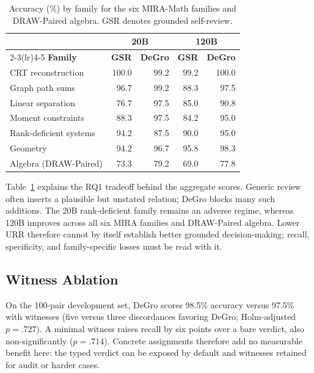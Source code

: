 \documentclass[sigconf,anonymous]{aamas}
\begin{document}
\begin{table}[t]
\centering
\caption{Accuracy (\%) by family for the six MIRA-Math families and DRAW-Paired algebra. GSR denotes grounded self-review.}
\label{tab:family}
\setlength{\tabcolsep}{3.5pt}
\renewcommand{\arraystretch}{1.05}
\begin{tabular}{@{}lrrrr@{}}
\toprule
& \multicolumn{2}{c}{\textbf{20B}} & \multicolumn{2}{c}{\textbf{120B}}\\
\cmidrule(lr){2-3}\cmidrule(lr){4-5}
\textbf{Family} & \textbf{GSR} & \textbf{DeGro} & \textbf{GSR} & \textbf{DeGro}\\
\midrule
CRT reconstruction       & 100.0 & 99.2 & 99.2 & 100.0\\
Graph path sums          & 96.7  & 99.2 & 88.3 & 97.5\\
Linear separation        & 76.7  & 97.5 & 85.0 & 90.8\\
Moment constraints       & 88.3  & 97.5 & 84.2 & 95.0\\
Rank-deficient systems   & 94.2  & 87.5 & 90.0 & 95.0\\
Geometry                 & 94.2  & 96.7 & 95.8 & 98.3\\
Algebra (DRAW-Paired)    & 73.3  & 79.2 & 69.0 & 77.8\\
\bottomrule
\end{tabular}
\end{table}

Table~\ref{tab:family} explains the RQ1 tradeoff behind the aggregate scores.  Generic review often inserts a plausible but unstated relation; DeGro blocks many such additions.  The 20B rank-deficient family remains an adverse regime, whereas 120B improves across all six MIRA families and DRAW-Paired algebra.  Lower URR therefore cannot by itself establish better grounded decision-making; recall, specificity, and family-specific losses must be read with it.

\subsection{Witness Ablation}
On the 100-pair development set, DeGro scores 98.5\% accuracy versus 97.5\% with witnesses (five versus three discordances favoring DeGro; Holm-adjusted $p=.727$).  A minimal witness raises recall by six points over a bare verdict, also non-significantly ($p=.714$).  Concrete assignments therefore add no measurable benefit here: the typed verdict can be exposed by default and witnesses retained for audit or harder cases.
\end{document}
